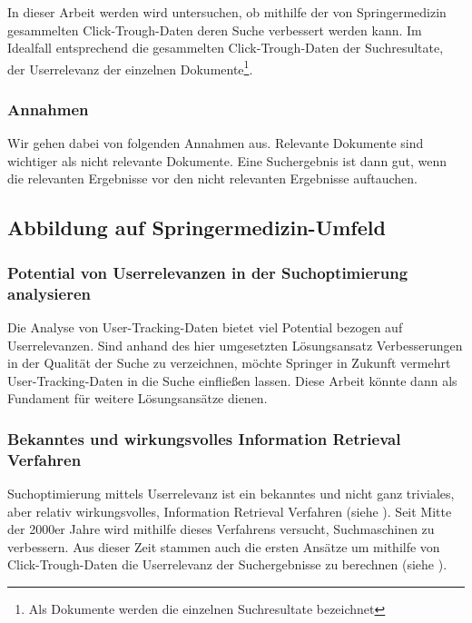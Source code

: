 In dieser Arbeit werden wird untersuchen, ob mithilfe der von Springermedizin gesammelten Click-Trough-Daten deren Suche verbessert werden kann. Im Idealfall entsprechend die gesammelten Click-Trough-Daten der Suchresultate, der Userrelevanz der einzelnen Dokumente\footnote{Als Dokumente werden die einzelnen Suchresultate bezeichnet}.

\subsubsection{Annahmen}
\label{sec:Einfuehrung:ZielArbeit:Suchoptimierung:Annahmen}

Wir gehen dabei von folgenden Annahmen aus. Relevante Dokumente sind wichtiger als nicht relevante Dokumente. Eine Suchergebnis ist dann gut, wenn die relevanten Ergebnisse vor den nicht relevanten Ergebnisse auftauchen. 

\subsection{Abbildung auf Springermedizin-Umfeld}
\label{sec:Einfuehrung:ZielArbeit:AbbildungSpringermedizinUmfeld}

\subsubsection{Potential von Userrelevanzen in der Suchoptimierung analysieren}
\label{sec:Einfuehrung:ZielArbeit:Potential}

Die Analyse von User-Tracking-Daten bietet viel Potential bezogen auf Userrelevanzen. Sind anhand des hier umgesetzten Lösungsansatz Verbesserungen in der Qualität der Suche zu verzeichnen, möchte Springer in Zukunft vermehrt User-Tracking-Daten in die Suche einfließen lassen. Diese Arbeit könnte dann als Fundament für weitere Lösungsansätze dienen.

\subsubsection{Bekanntes und wirkungsvolles Information Retrieval Verfahren}
\label{sec:Einfuehrung:ZielArbeit:AbbildungSpringermedizinUmfeld:InformationRetrievalVerfahren}

Suchoptimierung mittels Userrelevanz ist ein bekanntes und nicht ganz triviales, aber relativ wirkungsvolles, Information Retrieval Verfahren (siehe \cite{IWUSBI}). Seit Mitte der 2000er Jahre wird mithilfe dieses Verfahrens versucht, Suchmaschinen zu verbessern. Aus dieser Zeit stammen auch die ersten Ansätze um mithilfe von Click-Trough-Daten die Userrelevanz der Suchergebnisse zu berechnen (siehe \cite{Joachims}).

